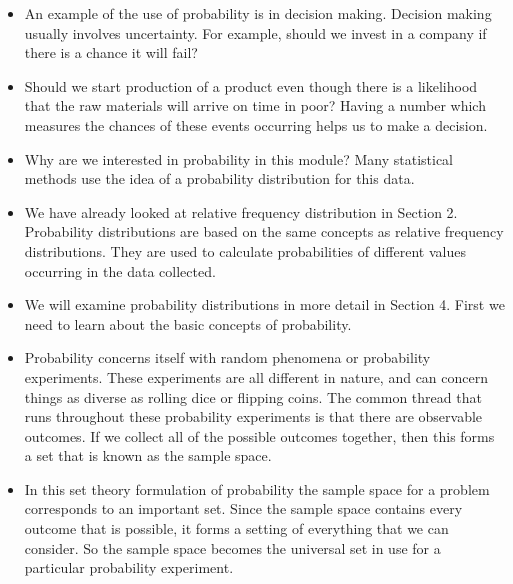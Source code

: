\documentclass[]{report}
\begin{document}
{{{{{{\begin{itemize}
\item An example of the use of probability is in decision making. Decision making usually involves uncertainty. For example, should we invest in a company if there is a chance it will fail? 

\item Should we start production of a product even though there is a likelihood that the raw materials will arrive on time in poor? Having a number which measures the chances of these events occurring helps us to make a decision.


\item Why are we interested in probability in this module? Many statistical methods use the idea of a probability distribution for this data.

\item We have already looked at relative frequency distribution in Section 2. Probability distributions are based on the same concepts as relative frequency distributions. They are used to calculate probabilities of different values occurring in the data collected.
\item We will examine probability distributions in more detail in Section 4. First we need to learn about the basic concepts of probability.


\item Probability concerns itself with random phenomena or probability experiments. These experiments are all different in nature, and can concern things as diverse as rolling dice or flipping coins. The common thread that runs throughout these probability experiments is that there are observable outcomes. If we collect all of the possible outcomes together, then this forms a set that is known as the sample space.

\item In this set theory formulation of probability the sample space for a problem corresponds to an important set. Since the sample space contains every outcome that is possible, it forms a setting of everything that we can consider. So the sample space becomes the universal set in use for a particular probability experiment.
\end{itemize}






}}}}}}
\end{document}
